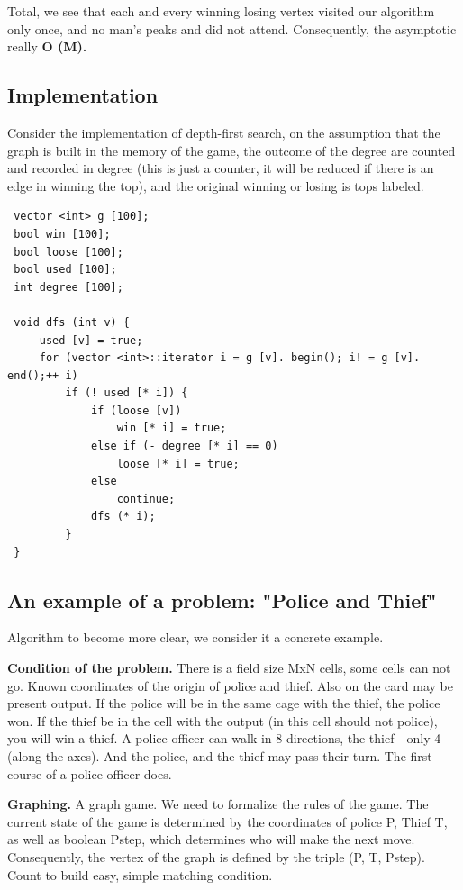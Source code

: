Total, we see that each and every winning losing vertex visited our algorithm only once, and no man's peaks and did not attend. Consequently, the asymptotic really \textbf{O (M).}

\subsection{ Implementation }
Consider the implementation of depth-first search, on the assumption that the graph is built in the memory of the game, the outcome of the degree are counted and recorded in degree (this is just a counter, it will be reduced if there is an edge in winning the top), and the original winning or losing is tops labeled.

\begin{verbatim}
 vector <int> g [100];
 bool win [100];
 bool loose [100];
 bool used [100];
 int degree [100];

 void dfs (int v) {
     used [v] = true;
     for (vector <int>::iterator i = g [v]. begin(); i! = g [v]. end();++ i)
         if (! used [* i]) {
             if (loose [v])
                 win [* i] = true;
             else if (- degree [* i] == 0)
                 loose [* i] = true;
             else
                 continue;
             dfs (* i);
         }
 } 
\end{verbatim}\subsection{ An example of a problem: "Police and Thief" }
Algorithm to become more clear, we consider it a concrete example.

\textbf{Condition of the problem.} There is a field size MxN cells, some cells can not go. Known coordinates of the origin of police and thief. Also on the card may be present output. If the police will be in the same cage with the thief, the police won. If the thief be in the cell with the output (in this cell should not police), you will win a thief. A police officer can walk in 8 directions, the thief - only 4 (along the axes). And the police, and the thief may pass their turn. The first course of a police officer does.

\textbf{Graphing.} A graph game. We need to formalize the rules of the game. The current state of the game is determined by the coordinates of police P, Thief T, as well as boolean Pstep, which determines who will make the next move. Consequently, the vertex of the graph is defined by the triple (P, T, Pstep). Count to build easy, simple matching condition.

